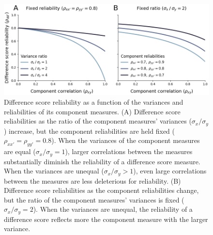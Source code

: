 \documentclass[a4paper,12pt]{article}
\begin{document}
\begin{figure}[tp]
    \centering
    \includegraphics[width=1\textwidth]{figures/fig02.png}
    \caption{\small Difference score reliability as a function of the variances and reliabilities of its component measures. (A) Difference score reliabilities as the ratio of the component measures' variances ($\sigma_x / \sigma_y$) increase, but the component reliabilities are held fixed ($\rho_{xx'} = \rho_{yy'} = 0.8$). When the variances of the component measures are equal ($\sigma_x / \sigma_y = 1$), larger correlations between the measures substantially diminish the reliability of a difference score measure. When the variances are unequal ($\sigma_x / \sigma_y > 1$), even large correlations between the measures are less deleterious for reliability. (B) Difference score reliabilities as the component reliabilities change, but the ratio of the component measures' variances is fixed ($\sigma_x / \sigma_y = 2$). When the variances are unequal, the reliability of a difference score reflects more the component measure with the larger variance.}
    \label{fig:fig03}
\end{figure}
\end{document}
